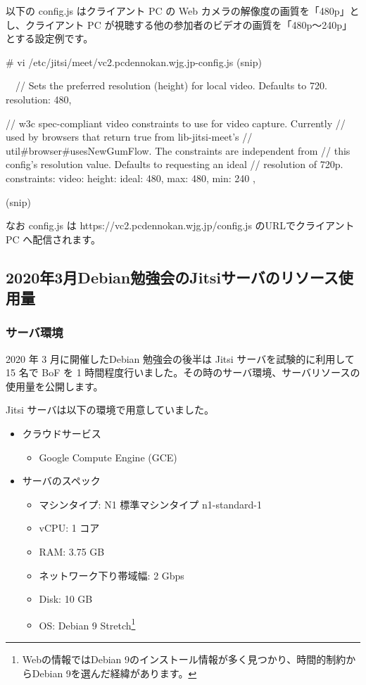 \documentclass[mingoth,a4paper]{jsarticle}
\begin{document}
以下の config.js はクライアント PC の Web カメラの解像度の画質を「480p」とし、クライアント PC が視聴する他の参加者のビデオの画質を「480p〜240p」とする設定例です。

\begin{commandline}
# vi /etc/jitsi/meet/vc2.pcdennokan.wjg.jp-config.js
    (snip)
  
  　// Sets the preferred resolution (height) for local video. Defaults to 720.
    resolution: 480,

    // w3c spec-compliant video constraints to use for video capture. Currently
    // used by browsers that return true from lib-jitsi-meet's
    // util#browser#usesNewGumFlow. The constraints are independent from
    // this config's resolution value. Defaults to requesting an ideal
    // resolution of 720p.
    constraints: {
        video: {
            height: {
                ideal: 480,
                max: 480,
                min: 240
            }
        }
    },

    (snip)
\end{commandline}

なお config.js は https://vc2.pcdennokan.wjg.jp/config.js のURLでクライアント PC へ配信されます。


\subsection{2020年3月Debian勉強会のJitsiサーバのリソース使用量}

\subsubsection{サーバ環境}

2020 年 3 月に開催したDebian 勉強会の後半は Jitsi サーバを試験的に利用して 15 名で BoF を 1 時間程度行いました。その時のサーバ環境、サーバリソースの使用量を公開します。

Jitsi サーバは以下の環境で用意していました。

\begin{itemize}
\item クラウドサービス
  \begin{itemize}
  \item Google Compute Engine (GCE)
  \end{itemize}
\item サーバのスペック
  \begin{itemize}
  \item マシンタイプ: N1 標準マシンタイプ n1-standard-1
  \item vCPU: 1 コア
  \item RAM: 3.75 GB
  \item ネットワーク下り帯域幅: 2 Gbps
  \item Disk: 10 GB
  \item OS: Debian 9 Stretch\footnote{Webの情報ではDebian 9のインストール情報が多く見つかり、時間的制約からDebian 9を選んだ経緯があります。}
  \end{itemize}
\end{itemize}
\end{document}
